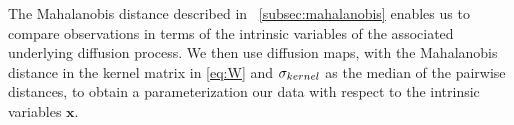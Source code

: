 The Mahalanobis distance described in \sec~\ref{subsec:mahalanobis} enables us to compare observations in terms of the intrinsic variables of the associated underlying diffusion process.
%
We then use diffusion maps, with the Mahalanobis distance in the kernel matrix in \eqref{eq:W} and $\sigma_{kernel}$ as the median of the pairwise distances, to obtain a parameterization our data with respect to the intrinsic variables $\mathbf{x}$. 
%
%
%
